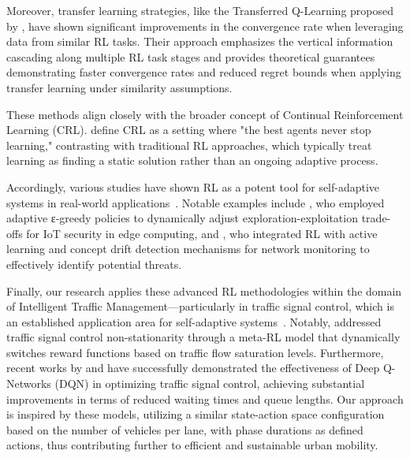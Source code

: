 Moreover, transfer learning strategies, like the Transferred Q-Learning proposed by \citet{chen2022transferredqlearning}, have shown significant improvements in the convergence rate when leveraging data from similar RL tasks. Their approach emphasizes the vertical information cascading along multiple RL task stages and provides theoretical guarantees demonstrating faster convergence rates and reduced regret bounds when applying transfer learning under similarity assumptions.

These methods align closely with the broader concept of Continual Reinforcement Learning (CRL). \citet{khetarpal2022continualreinforcementlearningreview} define CRL as a setting where "the best agents never stop learning," contrasting with traditional RL approaches, which typically treat learning as finding a static solution rather than an ongoing adaptive process.

Accordingly, various studies have shown RL as a potent tool for self-adaptive systems in real-world applications~\cite{HENRICHS2022106940}. Notable examples include \citet{iotdynamicrl}, who employed adaptive ε-greedy policies to dynamically adjust exploration-exploitation trade-offs for IoT security in edge computing, and \citet{networkdynamicrl}, who integrated RL with active learning and concept drift detection mechanisms for network monitoring to effectively identify potential threats.

Finally, our research applies these advanced RL methodologies within the domain of Intelligent Traffic Management—particularly in traffic signal control, which is an established application area for self-adaptive systems~\cite{HENRICHS2022106940}. Notably, \citet{meta-rl-traffic} addressed traffic signal control non-stationarity through a meta-RL model that dynamically switches reward functions based on traffic flow saturation levels. Furthermore, recent works by \citet{Swapno2024} and \citet{MORENOMALO2024124178} have successfully demonstrated the effectiveness of Deep Q-Networks (DQN) in optimizing traffic signal control, achieving substantial improvements in terms of reduced waiting times and queue lengths. Our approach is inspired by these models, utilizing a similar state-action space configuration based on the number of vehicles per lane, with phase durations as defined actions, thus contributing further to efficient and sustainable urban mobility.



\endinput


